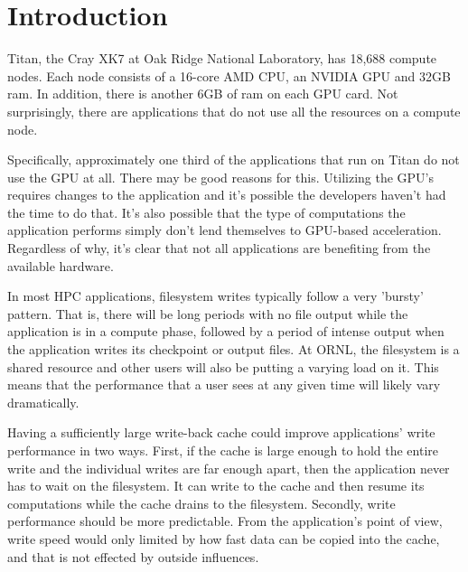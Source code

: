 \section{Introduction}
\label{sec:intro}



Titan, the Cray XK7 at Oak Ridge National Laboratory, has 18,688 compute nodes. Each node consists of a 16-core AMD CPU, an NVIDIA GPU and 32GB ram. In addition, there is another 6GB of ram on each GPU card. Not surprisingly, there are applications that do not use all the resources on a compute node.

Specifically, approximately one third of the applications that run on Titan do not use the GPU at all.
There may be good reasons for this.  Utilizing the GPU's requires changes to the application and it's possible the developers haven't had the time to do that.  It's also possible that the type of computations the application performs simply don't lend themselves to GPU-based acceleration.  Regardless of why, it's clear that not all applications are benefiting from the available hardware.


In most HPC applications, filesystem writes typically follow a very 'bursty' pattern. That is, there will be long periods with no file output while the application is in a compute phase, followed by a period of intense output when the application writes its checkpoint or output files. At ORNL, the filesystem is a shared resource and other users will also be putting a varying load on it. This means that the performance that a user sees at any given time will likely vary dramatically.

Having a sufficiently large write-back cache could improve applications' write performance in two ways.  First, if the cache is large enough to hold the entire write and the individual writes are far enough apart, then the application never has to wait on the filesystem.  It can write to the cache and then resume its computations while the cache drains to the filesystem.  Secondly, write performance should be more predictable. From the application's point of view, write speed would only limited by how fast data can be copied into the cache, and that is not effected by outside influences.



